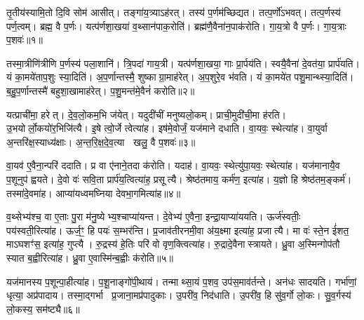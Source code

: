 \clearpage
{}
\setcounter{anuvakam}{0}

तृ॒तीय॑स्यामि॒तो दि॒वि सोम॑ आसीत्।
तङ्गा॑य॒त्र्या\-ऽह॑रत्।
तस्य॑ प॒र्णम॑च्छिद्यत।
तत्प॒र्णो॑\-ऽभवत्।
तत्प॒र्णस्य॑ पर्ण॒त्वम्।
ब्रह्म॒ वै प॒र्णः।
यत्प॑र्णशा॒खया॑ व॒थ्सान॑पाक॒रोति॑।
ब्रह्म॑णै॒वैना॑न॒पाक॑रोति।
गा॒य॒त्रो वै प॒र्णः।
गा॒य॒त्राः प॒शवः॑॥१॥

तस्मा॒त्रीणि॑त्रीणि प॒र्णस्य॑ पला॒शानि॑।
त्रि॒पदा॑ गाय॒त्री।
यत्प॑र्णशा॒खया॒ गाः प्रा॒र्पय॑ति।
स्वयै॒वैना॑ दे॒वत॑या॒ प्रार्प॑यति।
यं का॒मये॑ताप॒शुः स्या॒दिति॑।
अ॒प॒र्णान्तस्मै॒ शुष्काग्रा॒माह॑रेत्।
अ॒प॒शुरे॒व भ॑वति।
यं का॒मये॑त पशु॒मान्थ्स्या॒दिति॑।
ब॒हु॒प॒र्णान्तस्मै॑ बहुशा॒खामाह॑रेत्।
प॒शु॒मन्त॑मे॒वैनं॑ करोति॥२॥

यत्प्राची॑मा॒ हरेत्।
दे॒व॒लो॒कम॒भि ज॑येत्।
यदुदी॑चीं मनुष्यलो॒कम्।
प्राची॒मुदी॑ची॒मा ह॑रति।
उ॒भयोर्लो॒कयो॑र॒भि\-जि॑त्यै।
इ॒षे त्वो॒र्जे त्वेत्या॑ह।
इष॑मे॒वोर्जं॒ यज॑माने दधाति।
वा॒यवः॒ स्थेत्या॑ह।
वा॒युर्वा अ॒न्तरि॑क्ष॒स्याध्य॑क्षाः।
अ॒न्त॒रि॒क्ष॒दे॒व॒त्या खलु॒ वै प॒शवः॑॥३॥

वा॒यव॑ ए॒वैना॒न्परि॑ ददाति।
प्र वा ए॑नाने॒तदा क॑रोति।
यदाह॑।
वा॒यवः॒ स्थेत्यु॑पा॒यवः॒ स्थेत्या॑ह।
यज॑मानायै॒व प॒शूनुप॑ ह्वयते।
दे॒वो वः॑ सवि॒ता प्रार्प॑य॒त्वित्या॑ह॒ प्रसूत्यै।
श्रेष्ठ॑तमाय॒ कर्म॑ण॒ इत्या॑ह।
य॒ज्ञो हि श्रेष्ठ॑तम॒ङ्कर्म॑।
तस्मा॑दे॒वमा॑ह।
आप्या॑यध्वमघ्निया देवभा॒गमित्या॑ह॥४॥

व॒थ्सेभ्य॑श्च॒ वा ए॒ताः पु॒रा म॑नु॒ष्येभ्य॒श्चाप्या॑यन्त।
दे॒वेभ्य॑ ए॒वैना॒ इन्द्रा॒याप्या॑ययति।
ऊर्ज॑स्वतीः॒ पय॑स्वती॒रित्या॑ह।
ऊर्ज॒ꣳ॒ हि पयः॑ स॒म्भर॑न्ति।
प्र॒जाव॑तीरनमी॒वा अ॑य॒क्ष्मा इत्या॑ह॒ प्रजात्यै।
मा वः॑ स्ते॒न ई॑शत॒ माऽघशꣳ॑स॒ इत्या॑ह॒ गुप्त्यै।
रु॒द्रस्य॑ हे॒तिः परि॑ वो वृण॒क्त्वित्या॑ह।
रु॒द्रादे॒वैनास्त्रायते।
ध्रु॒वा अ॒स्मिन्गोप॑तौ स्यात ब॒ह्वीरित्या॑ह।
ध्रु॒वा ए॒वास्मि॑न्ब॒ह्वीः क॑रोति॥५॥

यज॑मानस्य प॒शून्पा॒हीत्या॑ह।
प॒शू॒नाङ्गो॑पी॒थाय॑।
तन्माथ्सा॒यं प॒शव॒ उप॑स॒माव॑र्तन्ते।
अन॑धः सादयति।
गर्भा॑णां॒ धृत्या॒ अप्र॑पादाय।
तस्मा॒द्गर्भा प्र॒जाना॒मप्र॑पादुकाः।
उ॒परी॑व॒ निद॑धाति।
उ॒परी॑व॒ हि सु॑व॒र्गो लो॒कः।
सु॒व॒र्गस्य॑ लो॒कस्य॒ सम॑ष्ट्यै॥६॥\anuvakamend[प॒शवः॑ करोति प॒शवो॑ देवभा॒गमित्या॑ह करोति॒ नव॑ च]

